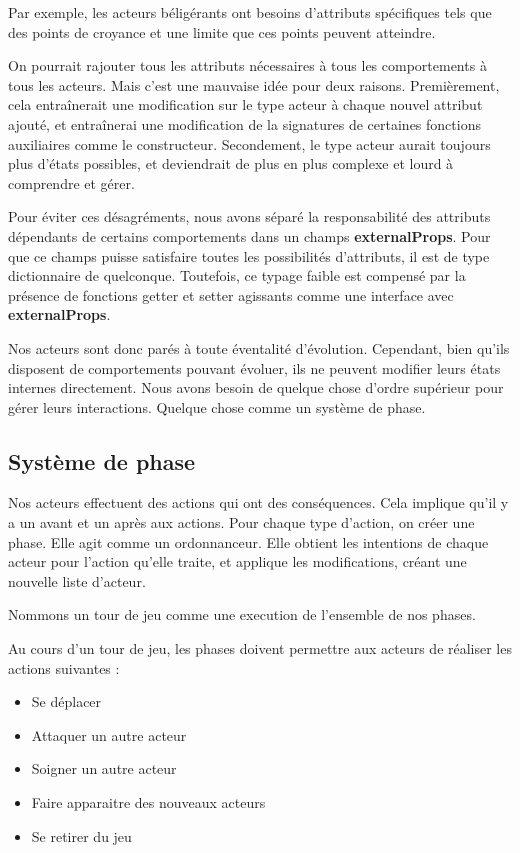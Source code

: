 \documentclass{article}
\begin{document}
Par exemple, les acteurs béligérants ont besoins d'attributs spécifiques tels que des points de croyance et une limite que ces points peuvent atteindre.

On pourrait rajouter tous les attributs nécessaires à tous les comportements 
à tous les acteurs. Mais c'est une mauvaise idée pour deux raisons.
Premièrement, cela entraînerait une modification sur le type acteur à chaque nouvel attribut ajouté, et entraînerai une modification de la signatures de certaines fonctions auxiliaires comme le constructeur.
Secondement, le type acteur aurait toujours plus d'états possibles, 
et deviendrait de plus en plus complexe et lourd à comprendre et gérer.

Pour éviter ces désagréments, nous avons séparé la responsabilité des attributs 
dépendants de certains comportements dans un champs \textbf{externalProps}.
Pour que ce champs puisse satisfaire toutes les possibilités d'attributs, il
est de type dictionnaire de quelconque. Toutefois, ce typage faible est compensé 
par la présence de fonctions getter et setter agissants comme une interface 
avec \textbf{externalProps}.

Nos acteurs sont donc parés à toute éventalité d'évolution.
Cependant, bien qu'ils disposent de comportements pouvant évoluer, ils ne peuvent modifier leurs 
états internes directement.
Nous avons besoin de quelque chose d'ordre supérieur pour gérer leurs interactions.
Quelque chose comme un système de phase.

\subsection{Système de phase}

Nos acteurs effectuent des actions qui ont des conséquences.
Cela implique qu'il y a un avant et un après aux actions.
Pour chaque type d'action, on créer une phase.
Elle agit comme un ordonnanceur. Elle obtient les intentions de chaque 
acteur pour l'action qu'elle traite, et applique les modifications, 
créant une nouvelle liste d'acteur.

Nommons un tour de jeu comme une execution de l'ensemble de nos phases.

Au cours d'un tour de jeu, les phases doivent permettre aux acteurs de réaliser les actions suivantes :
\vspace{-10px}
\begin{itemize}
  \item Se déplacer
  \item Attaquer un autre acteur
  \item Soigner un autre acteur
  \item Faire apparaitre des nouveaux acteurs
  \item Se retirer du jeu
\end{itemize}  
\end{document}
